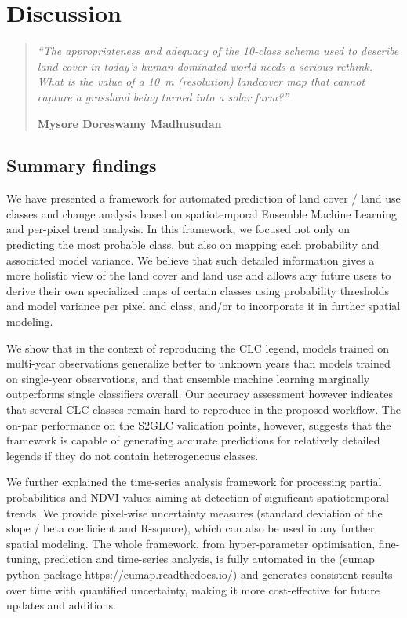 \section{Discussion}


\begin{quote}
\emph{``The appropriateness and adequacy of the 10-class schema used to describe land cover in today's human-dominated world needs a serious rethink. What is the value of a 10~m (resolution) landcover map that cannot capture a grassland being turned into a solar farm?''}\par
\textbf{Mysore Doreswamy Madhusudan}
\end{quote}

\subsection*{Summary findings}
    
We have presented a framework for automated prediction of land cover / land use classes and change analysis based on spatiotemporal Ensemble Machine Learning and per-pixel trend analysis. In this framework, we focused not only on predicting the most probable class, but also on mapping each probability and associated model variance. We believe that such detailed information gives a more holistic view of the land cover and land use and allows any future users to derive their own specialized maps of certain classes using probability thresholds and model variance per pixel and class, and/or to incorporate it in further spatial modeling. 

We show that in the context of reproducing the CLC legend, models trained on multi-year observations generalize better to unknown years than models trained on single-year observations, and that ensemble machine learning marginally outperforms single classifiers overall. Our accuracy assessment however indicates that several CLC classes remain hard to reproduce in the proposed workflow. The on-par performance on the S2GLC validation points, however, suggests that the framework is capable of generating accurate predictions for relatively detailed legends if they do not contain heterogeneous classes.
    
We further explained the time-series analysis framework for processing partial probabilities and NDVI values aiming at detection of significant spatiotemporal trends. We provide pixel-wise uncertainty measures (standard deviation of the slope / beta coefficient and R-square), which can also be used in any further spatial modeling. The whole framework, from hyper-parameter optimisation, fine-tuning, prediction and time-series analysis, is fully automated in the (\textsf{eumap} python package \url{https://eumap.readthedocs.io/}) and generates consistent results over time with quantified uncertainty, making it more cost-effective for future updates and additions.

